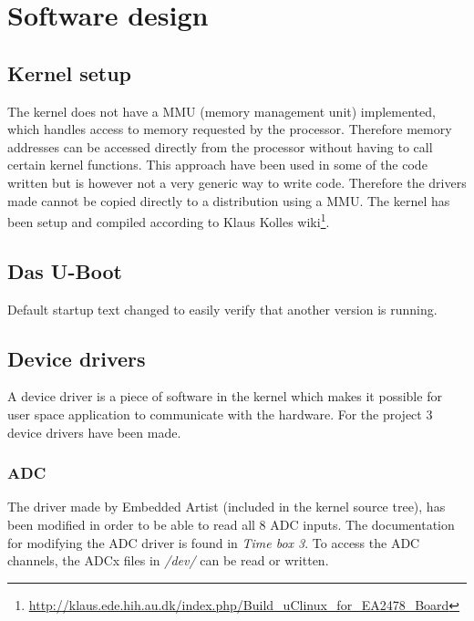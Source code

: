 \chapter{Software design}
\section{Kernel setup}
%
The kernel does not have a MMU (memory management unit) implemented, which handles access to memory requested by the processor. Therefore memory addresses can be accessed directly from the processor without having to call certain kernel functions. This approach have been used in some of the code written but is however not a very generic way to write code. Therefore the drivers made cannot be copied directly to a distribution using a MMU.
\p The kernel has been setup and compiled according to Klaus Kolles wiki\footnote{\url{http://klaus.ede.hih.au.dk/index.php/Build_uClinux_for_EA2478_Board}}.

\section{Das U-Boot}
%
Default startup text changed to easily verify that another version is running.

\section{Device drivers}
%
A device driver is a piece of software in the kernel which makes it possible for user space application to communicate with the hardware. For the project 3 device drivers have been made.
\subsection{ADC}
The driver made by Embedded Artist (included in the kernel source tree), has been modified in order to be able to read all 8 ADC inputs. The documentation for modifying the ADC driver is found in \textit{Time box 3}. 
\p To access the ADC channels, the ADCx files in \textit{/dev/} can be read or written.
